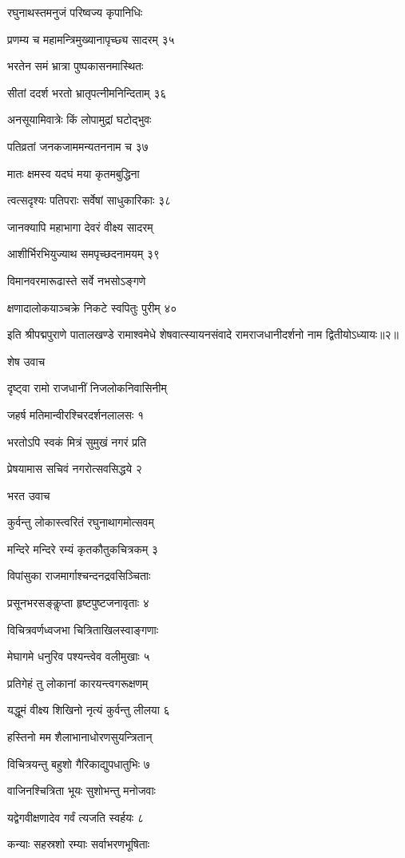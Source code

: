 रघुनाथस्तमनुजं परिष्वज्य कृपानिधिः

प्रणम्य च महामन्त्रिमुख्यानापृच्छ्य सादरम् ३५

भरतेन समं भ्रात्रा पुष्पकासनमास्थितः

सीतां ददर्श भरतो भ्रातृपत्नीमनिन्दिताम् ३६

अनसूयामिवात्रेः किं लोपामुद्रां घटोद्भुवः

पतिव्रतां जनकजाममन्यतननाम च ३७

मातः क्षमस्व यदघं मया कृतमबुद्धिना

त्वत्सदृश्यः पतिपराः सर्वेषां साधुकारिकाः ३८

जानक्यापि महाभागा देवरं वीक्ष्य सादरम्

आशीर्भिरभियुज्याथ समपृच्छदनामयम् ३९

विमानवरमारूढास्ते सर्वे नभसोऽङ्गणे

क्षणादालोकयाञ्चक्रे निकटे स्वपितुः पुरीम् ४०

इति श्रीपद्मपुराणे पातालखण्डे रामाश्वमेधे शेषवात्स्यायनसंवादे रामराजधानीदर्शनो नाम द्वितीयोऽध्यायः॥२॥


शेष उवाच

दृष्ट्वा रामो राजधानीं निजलोकनिवासिनीम्

जहर्ष मतिमान्वीरश्चिरदर्शनलालसः १

भरतोऽपि स्वकं मित्रं सुमुखं नगरं प्रति

प्रेषयामास सचिवं नगरोत्सवसिद्धये २

भरत उवाच

कुर्वन्तु लोकास्त्वरितं रघुनाथागमोत्सवम्

मन्दिरे मन्दिरे रम्यं कृतकौतुकचित्रकम् ३

विपांसुका राजमार्गाश्चन्दनद्रवसिञ्चिताः

प्रसूनभरसङ्कॢप्ता हृष्टपुष्टजनावृताः ४

विचित्रवर्णध्वजभा चित्रिताखिलस्वाङ्गणाः

मेघागमे धनुरिव पश्यन्त्वेव वलीमुखाः ५

प्रतिगेहं तु लोकानां कारयन्त्वगरूक्षणम्

यद्धूमं वीक्ष्य शिखिनो नृत्यं कुर्वन्तु लीलया ६

हस्तिनो मम शैलाभानाधोरणसुयन्त्रितान्

विचित्रयन्तु बहुशो गैरिकाद्युपधातुभिः ७

वाजिनश्चित्रिता भूयः सुशोभन्तु मनोजवाः

यद्वेगवीक्षणादेव गर्वं त्यजति स्वर्हयः ८

कन्याः सहस्रशो रम्याः सर्वाभरणभूषिताः


